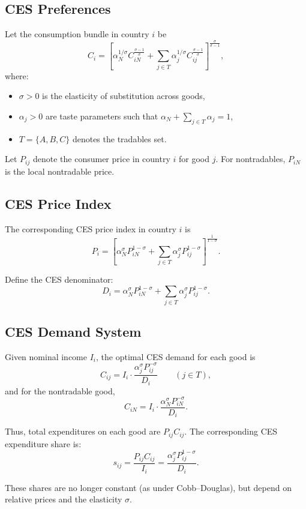\documentclass[11pt]{article}
\begin{document}
\subsection*{CES Preferences}

Let the consumption bundle in country $i$ be
\[
C_i = 
\left[
    \alpha_N^{1/\sigma} C_{iN}^{\frac{\sigma-1}{\sigma}}
    + \sum_{j \in T} \alpha_j^{1/\sigma} C_{ij}^{\frac{\sigma-1}{\sigma}}
\right]^{\frac{\sigma}{\sigma-1}},
\]
where:
\begin{itemize}
    \item $\sigma > 0$ is the elasticity of substitution across goods, 
    \item $\alpha_j > 0$ are taste parameters such that 
          $\alpha_N + \sum_{j \in T} \alpha_j = 1$,
    \item $T = \{A,B,C\}$ denotes the tradables set.
\end{itemize}

Let $P_{ij}$ denote the consumer price in country $i$ for good $j$.
For nontradables, $P_{iN}$ is the local nontradable price.

\subsection*{CES Price Index}

The corresponding CES price index in country $i$ is
\[
P_i = 
\left[
    \alpha_N^\sigma P_{iN}^{1-\sigma}
    + \sum_{j \in T} \alpha_j^\sigma P_{ij}^{1-\sigma}
\right]^{\frac{1}{1-\sigma}}.
\]

Define the CES denominator:
\[
D_i 
= 
\alpha_N^\sigma P_{iN}^{1-\sigma}
+ \sum_{j \in T} \alpha_j^\sigma P_{ij}^{1-\sigma}.
\]

\subsection*{CES Demand System}

Given nominal income $I_i$, the optimal CES demand for each good is
\[
C_{ij} 
= 
I_i \cdot 
\frac{\alpha_j^\sigma P_{ij}^{-\sigma}}{D_i}
\qquad (j \in T),
\]
and for the nontradable good,
\[
C_{iN}
=
I_i \cdot 
\frac{\alpha_N^\sigma P_{iN}^{-\sigma}}{D_i}.
\]

Thus, total expenditures on each good are $P_{ij} C_{ij}$.
The corresponding CES expenditure share is:
\[
s_{ij} 
= 
\frac{P_{ij} C_{ij}}{I_i}
= 
\frac{\alpha_j^\sigma P_{ij}^{1-\sigma}}{D_i}.
\]

These shares are no longer constant (as under Cobb--Douglas), 
but depend on relative prices and the elasticity $\sigma$.
\end{document}
